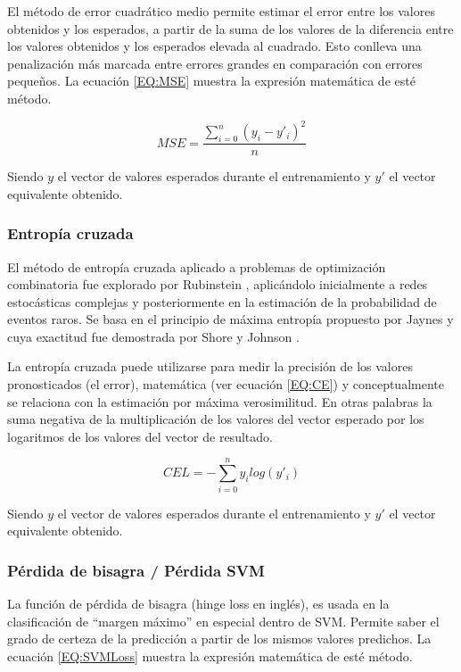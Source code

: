             El método de error cuadrático medio permite estimar el error entre los valores obtenidos y los esperados, a partir de la suma de los valores de la diferencia entre los valores obtenidos y los esperados elevada al cuadrado. Esto conlleva una penalización más marcada entre errores grandes en comparación con errores pequeños. La ecuación \ref{EQ:MSE} muestra la expresión matemática de esté método.
            
            \begin{equation}
            	\label{EQ:MSE}
            	MSE = \frac{ \sum_{i=0}^{n} (y_i - y'_i)^2}{n}
            \end{equation}
            
            Siendo $y$ el vector de valores esperados durante el entrenamiento y $y'$ el vector equivalente obtenido.
        
        \subsubsection{Entropía cruzada}
            \label{sub2:FrameCrossEntropy}
            
            El método de entropía cruzada aplicado a problemas de optimización combinatoria fue explorado por Rubinstein \cite{Rubinstein1997CrossEntropy}, aplicándolo inicialmente a redes estocásticas complejas y posteriormente en la estimación de la probabilidad de eventos raros. Se basa en el principio de máxima entropía propuesto por Jaynes \cite{Jaynes1957InformationTheory} y cuya exactitud fue demostrada por Shore y Johnson \cite{Shore1980}.
            
            La entropía cruzada puede utilizarse para medir la precisión de los valores pronosticados (el error), matemática (ver ecuación \ref{EQ:CE}) y conceptualmente se relaciona con la estimación por máxima verosimilitud. En otras palabras la suma negativa de la multiplicación de los valores del vector esperado por los logaritmos de los valores del vector de resultado.
            
            \begin{equation}
            	\label{EQ:CE}
            	CEL = - \sum_{i=0}^{n} y_i log(y'_i)
            \end{equation}
            
            Siendo $y$ el vector de valores esperados durante el entrenamiento y $y'$ el vector equivalente obtenido.
        
        \subsubsection{Pérdida de bisagra / Pérdida SVM}
        \label{sub2:FrameSVM}
            La función de pérdida de bisagra (hinge loss en inglés), es usada en la clasificación de ``margen máximo'' en especial dentro de SVM. Permite saber el grado de certeza de la predicción a partir de los mismos valores predichos. La ecuación \ref{EQ:SVMLoss} muestra la expresión matemática de esté método.
        
